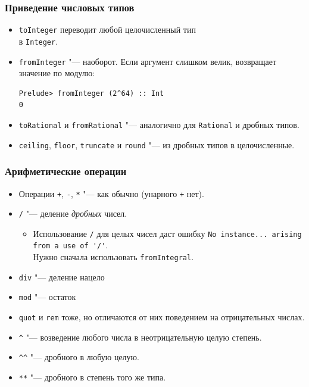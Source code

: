 \documentclass[10pt]{beamer}
\begin{document}
\begin{frame}[fragile]
\frametitle{Приведение числовых типов}
\begin{itemize}
    \item \lstinline|toInteger| переводит любой целочисленный тип \\в \lstinline|Integer|.
    \item \lstinline|fromInteger| "--- наоборот. Если аргумент слишком велик, возвращает значение по модулю:
    \begin{lstlisting}
Prelude> fromInteger (2^64) :: Int
0
\end{lstlisting}
    \item \lstinline|toRational| и \lstinline|fromRational| "--- аналогично для \lstinline|Rational| и дробных типов.
    \item \lstinline|ceiling|, \lstinline|floor|, \lstinline|truncate| и \lstinline|round| "--- из дробных типов в целочисленные.
\end{itemize}
\end{frame}

\begin{frame}[fragile]
\frametitle{Арифметические операции}
\begin{itemize}
    \item Операции \lstinline|+|, \lstinline|-|, \lstinline|*| "--- как обычно (унарного \lstinline|+| нет).
    \item \lstinline|/| "--- деление \emph{дробных} чисел.
    \begin{itemize}
        \item Использование \lstinline|/| для целых чисел даст ошибку \lstinline|No instance... arising from a use of '/'|. \\Нужно сначала использовать \lstinline|fromIntegral|.
    \end{itemize}        
    \item \lstinline|div| "--- деление нацело
    \item \lstinline|mod| "--- остаток
    \item
\lstinline|quot| и \lstinline|rem| тоже, но отличаются от них поведением на отрицательных числах.
    \item \lstinline|^| "--- возведение любого числа в неотрицательную  целую степень. 
   \item \lstinline|^^| "--- дробного в любую целую. 
   \item \lstinline|**| "--- дробного в степень того же типа.
\end{itemize}
\end{frame}
\end{document}
